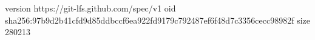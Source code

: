 version https://git-lfs.github.com/spec/v1
oid sha256:97b9d2b41cfd9d85ddbccf6ea922fd9179c792487ef6f48d7c3356cecc98982f
size 280213
